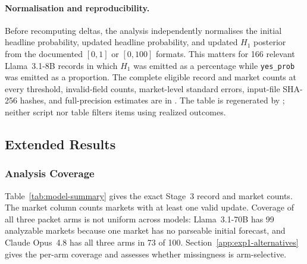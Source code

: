\paragraph{Normalisation and reproducibility.}
Before recomputing deltas, the analysis independently normalises the initial
headline probability, updated headline probability, and updated $H_1$
posterior from the documented $[0,1]$ or $[0,100]$ formats. This matters for
166 relevant Llama~3.1-8B records in which $H_1$ was emitted as a percentage
while \texttt{yes\_prob} was emitted as a proportion. The complete eligible
record and market counts at every threshold, invalid-field counts, market-level
standard errors, input-file SHA-256 hashes, and full-precision estimates are in
. The table is
regenerated by
; neither script
nor table filters items using realized outcomes.

\subsection{Extended Results}
\label{app:extended-results}

\subsubsection{Analysis Coverage}
Table~\ref{tab:model-summary} gives the exact Stage~3 record and market counts.
The market column counts markets with at least one valid update. Coverage of all
three packet arms is not uniform across models: Llama~3.1-70B has 99 analyzable
markets because one market has no parseable initial forecast, and Claude Opus~4.8
has all three arms in 73 of 100. Section~\ref{app:exp1-alternatives} gives the
per-arm coverage and assesses whether missingness is arm-selective.

